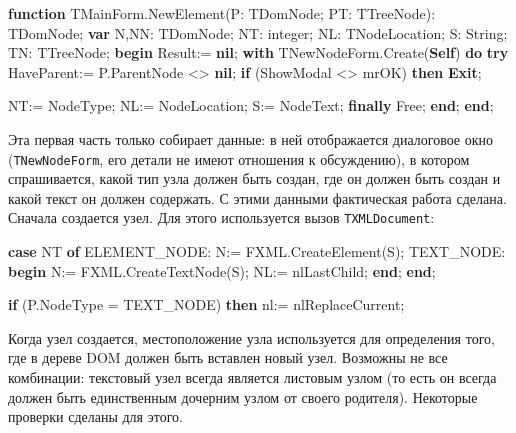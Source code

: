 \documentclass[
]{article}
\newenvironment{Shaded}{}{}
\newcommand{\DataTypeTok}[1]{\textcolor[rgb]{0.56,0.13,0.00}{#1}}
\newcommand{\KeywordTok}[1]{\textcolor[rgb]{0.00,0.44,0.13}{\textbf{#1}}}
\newcommand{\NormalTok}[1]{#1}
\begin{document}
\begin{Shaded}
\begin{Highlighting}[]
\KeywordTok{function}\NormalTok{ TMainForm.NewElement(P: TDomNode; PT: TTreeNode): TDomNode;}
\KeywordTok{var}
\NormalTok{  N,NN: TDomNode;}
\NormalTok{  NT: }\DataTypeTok{integer}\NormalTok{;}
\NormalTok{  NL: TNodeLocation;}
\NormalTok{  S: }\DataTypeTok{String}\NormalTok{;}
\NormalTok{  TN: TTreeNode;}
\KeywordTok{begin}
\NormalTok{  Result:= }\KeywordTok{nil}\NormalTok{;}
  \KeywordTok{with}\NormalTok{ TNewNodeForm.Create(}\KeywordTok{Self}\NormalTok{) }\KeywordTok{do}
  \KeywordTok{try}
\NormalTok{    HaveParent:= P.ParentNode \textless{}\textgreater{} }\KeywordTok{nil}\NormalTok{;}
    \KeywordTok{if}\NormalTok{ (ShowModal \textless{}\textgreater{} mrOK) }\KeywordTok{then} \KeywordTok{Exit}\NormalTok{;}

\NormalTok{    NT:= NodeType;}
\NormalTok{    NL:= NodeLocation;}
\NormalTok{    S:= NodeText;}
  \KeywordTok{finally}
\NormalTok{    Free;}
  \KeywordTok{end}\NormalTok{;}
\KeywordTok{end}\NormalTok{;}
\end{Highlighting}
\end{Shaded}

Эта первая часть только собирает данные: в ней отображается диалоговое
окно (\texttt{TNewNodeForm}, его детали не имеют отношения к
обсуждению), в котором спрашивается, какой тип узла должен быть создан,
где он должен быть создан и какой текст он должен содержать. С этими
данными фактическая работа сделана. Сначала создается узел. Для этого
используется вызов \texttt{TXMLDocument}:

\begin{Shaded}
\begin{Highlighting}[]
\KeywordTok{case}\NormalTok{ NT }\KeywordTok{of}
\NormalTok{ ELEMENT\_NODE: N:= FXML.CreateElement(S);}
\NormalTok{    TEXT\_NODE:}
          \KeywordTok{begin}
\NormalTok{            N:= FXML.CreateTextNode(S);}
\NormalTok{            NL:= nlLastChild;}
          \KeywordTok{end}\NormalTok{;}
\KeywordTok{end}\NormalTok{;}

\KeywordTok{if}\NormalTok{ (P.NodeType = TEXT\_NODE) }\KeywordTok{then}\NormalTok{ nl:= nlReplaceCurrent;}
\end{Highlighting}
\end{Shaded}

Когда узел создается, местоположение узла используется для определения
того, где в дереве DOM должен быть вставлен новый узел. Возможны не все
комбинации: текстовый узел всегда является листовым узлом (то есть он
всегда должен быть единственным дочерним узлом от своего родителя).
Некоторые проверки сделаны для этого.
\end{document}
